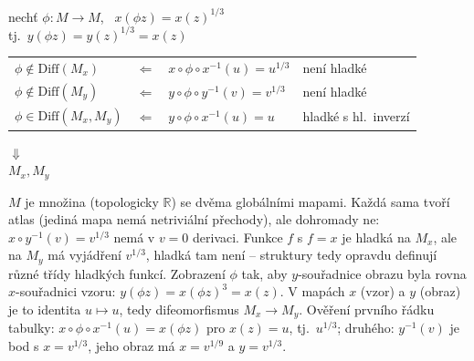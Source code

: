 \begin{priklad}
\begin{minipage}{0.62\textwidth}
\quad nechť $\phi: M\to M$, \ $x(\phi z) = x(z)^{1/3}$ \\
\quad\quad tj.\ $y(\phi z) = y(z)^{1/3} = x(z)$
\end{minipage}
\begin{minipage}{0.36\textwidth}
\end{minipage}

\begin{tabular}{@{}lcll}
$\phi\notin\mathrm{Diff}(M_x)$ & $\Leftarrow$ & $x\circ\phi\circ x^{-1}(u) = u^{1/3}$ & není hladké \\
$\phi\notin\mathrm{Diff}(M_y)$ & $\Leftarrow$ & $y\circ\phi\circ y^{-1}(v) = v^{1/3}$ & není hladké \\
$\phi\in\mathrm{Diff}(M_x,M_y)$ & $\Leftarrow$ & $y\circ\phi\circ x^{-1}(u) = u$ & hladké s hl.\ inverzí
\end{tabular}

$\Downarrow$ \\
$M_x, M_y$ 
\end{priklad}

\begin{vysvetleni}[Rozbor příkladu $y=x^3$]
$M$ je množina (topologicky $\mathbb{R}$) se dvěma globálními mapami. Každá sama tvoří atlas (jediná mapa nemá netriviální přechody), ale dohromady ne: $x\circ y^{-1}(v)=v^{1/3}$ nemá v $v=0$ derivaci. Funkce $f$ s $f=x$ je hladká na $M_x$, ale na $M_y$ má vyjádření $v^{1/3}$, hladká tam není -- struktury tedy opravdu definují různé třídy hladkých funkcí.
Zobrazení $\phi$  tak, aby $y$-souřadnice obrazu byla rovna $x$-souřadnici vzoru: $y(\phi z)=x(\phi z)^3=x(z)$. V mapách $x$ (vzor) a $y$ (obraz) je to identita $u\mapsto u$, tedy difeomorfismus $M_x\to M_y$. Ověření prvního řádku tabulky: $x\circ\phi\circ x^{-1}(u)=x(\phi z)$ pro $x(z)=u$, tj.\ $u^{1/3}$; druhého: $y^{-1}(v)$ je bod s $x=v^{1/3}$, jeho obraz má $x=v^{1/9}$ a $y=v^{1/3}$.
\end{vysvetleni}

